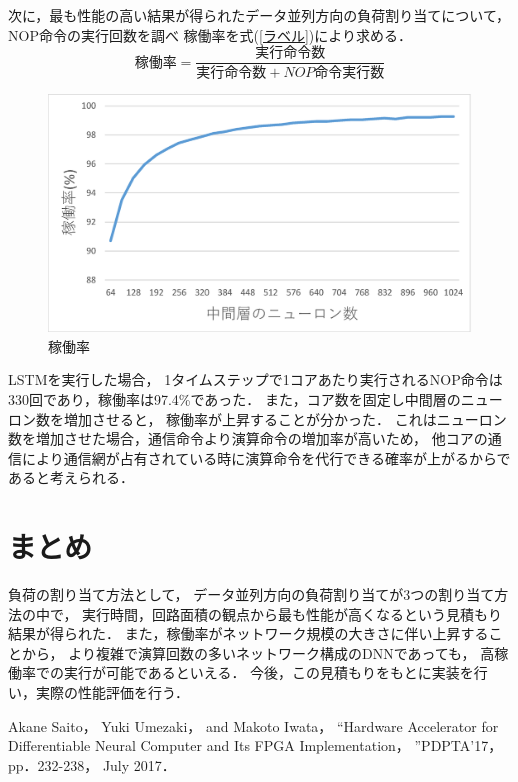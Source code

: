 \documentclass[a4j]{jarticle}
\begin{document}
\begin{Abstract}
次に，最も性能の高い結果が得られたデータ並列方向の負荷割り当てについて，
NOP命令の実行回数を調べ
稼働率を式(\ref{ラベル})により求める．
\begin{equation}
  稼働率 = \frac{実行命令数}{実行命令数+NOP命令実行数}
  \label{ラベル}
\end{equation}
\begin{figure}[h]
 \centering
 \includegraphics[scale=0.25]{kadouritu.eps}
 \caption{稼働率}
 \label{稼働率}
\end{figure}
LSTMを実行した場合，
1タイムステップで1コアあたり実行されるNOP命令は330回であり，稼働率は97.4\%であった．
また，コア数を固定し中間層のニューロン数を増加させると，
稼働率が上昇することが分かった．
これはニューロン数を増加させた場合，通信命令より演算命令の増加率が高いため，
他コアの通信により通信網が占有されている時に演算命令を代行できる確率が上がるからであると考えられる．

 \section{まとめ}
負荷の割り当て方法として，
データ並列方向の負荷割り当てが3つの割り当て方法の中で，
実行時間，回路面積の観点から最も性能が高くなるという見積もり結果が得られた．
また，稼働率がネットワーク規模の大きさに伴い上昇することから，
より複雑で演算回数の多いネットワーク構成のDNNであっても，
高稼働率での実行が可能であるといえる．
今後，この見積もりをもとに実装を行い，実際の性能評価を行う．


\begin{thebibliography}{99}
  Akane Saito， Yuki Umezaki， and Makoto Iwata，
  ``Hardware Accelerator for Differentiable Neural Computer and Its FPGA Implementation，
  ''PDPTA'17， pp．232-238， July 2017．
\end{thebibliography}

\end{Abstract}
\end{document}
